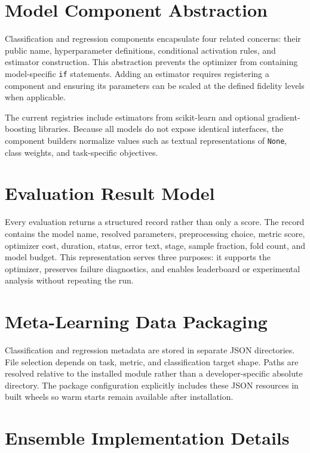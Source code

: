 \documentclass[12pt,a4paper,oneside]{report}
\begin{document}
\section{Model Component Abstraction}

Classification and regression components encapsulate four related concerns:
their public name, hyperparameter definitions, conditional activation rules,
and estimator construction. This abstraction prevents the optimizer from
containing model-specific \texttt{if} statements. Adding an estimator requires
registering a component and ensuring its parameters can be scaled at the
defined fidelity levels when applicable.

\medskip

\noindent The current registries include estimators from scikit-learn and optional
gradient-boosting libraries. Because all models do not expose identical
interfaces, the component builders normalize values such as textual
representations of \texttt{None}, class weights, and task-specific objectives.

\section{Evaluation Result Model}

Every evaluation returns a structured record rather than only a score. The
record contains the model name, resolved parameters, preprocessing choice,
metric score, optimizer cost, duration, status, error text, stage, sample
fraction, fold count, and model budget. This representation serves three
purposes: it supports the optimizer, preserves failure diagnostics, and enables
leaderboard or experimental analysis without repeating the run.

\section{Meta-Learning Data Packaging}

Classification and regression metadata are stored in separate JSON
directories. File selection depends on task, metric, and classification target
shape. Paths are resolved relative to the installed module rather than a
developer-specific absolute directory. The package configuration explicitly
includes these JSON resources in built wheels so warm starts remain available
after installation.

\section{Ensemble Implementation Details}
\end{document}
